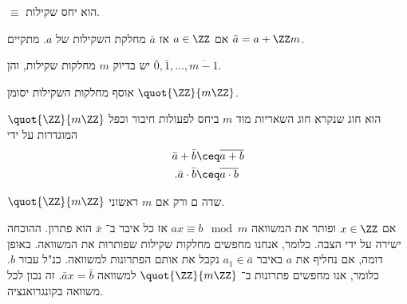 \documentclass[a4paper,10pt,twoside,openany]{book}
\begin{document}
\begin{proposition}
$\equiv$
הוא יחס שקילות.
\end{proposition}
\begin{notation}
אם
$a \in \ZZ$
אז
$\bar{a}$
מחלקת השקילות של
$a$.
מתקיים
$\bar{a} = a+\ZZ m$.
\end{notation}
\begin{proposition}
יש בדיוק
$m$
מחלקות שקילות, והן
$\bar{0},\bar{1}, \ldots, \overline{m-1}$.
\end{proposition}
\begin{notation}
אוסף מחלקות השקילות יסומן
$\quot{\ZZ}{m\ZZ}$.
\end{notation}
\begin{remark}
$\quot{\ZZ}{m\ZZ}$
הוא חוג שנקרא חוג השאריות מוד
$m$
ביחס לפעולות חיבור וכפל המוגדרות על ידי
\begin{align*}
\bar{a} + \bar{b} &\ceq \overline{a+b} \\
\text{.} \bar{a} \cdot \bar{b} &\ceq \overline{a\cdot b}
\end{align*}
\end{remark}
\begin{proposition}
$\quot{\ZZ}{m\ZZ}$
שדה ם ורק אם
$m$
ראשוני.
\end{proposition}
\begin{remark}
אם
$x \in \ZZ$
ופותר את המשוואה
$ax \equiv b \mod{m}$
אז כל איבר ב־%
$\bar{x}$
הוא פתרון.
ההוכחה ישירה על ידי הצבה. כלומר, אנחנו מחפשים מחלקות שקילות שפותרות את המשוואה.
באופן דומה, אם נחליף את
$a$
באיבר
$a_1 \in \bar{a}$
נקבל את אותם הפתרונות למשוואה. כנ"ל עבור
$b$.
כלומר, אנו מחפשים פתרונות ב־%
$\quot{\ZZ}{m\ZZ}$
למשוואה
$\bar{a}x = \bar{b}$.
זה נכון לכל משוואה בקונגרואנציה.
\end{remark}
\end{document}
